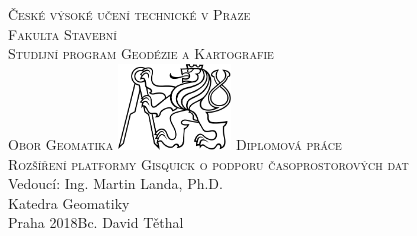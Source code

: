 \begin{center}
\newcommand{\napisCVUT}{České výsoké učení technické v Praze}
\newcommand{\napisFS}{Fakulta Stavební}
\newcommand{\napisProgram}{Studijní program Geodézie a Kartografie}
\newcommand{\napisObor}{Obor Geomatika}
\newcommand{\napisKatedra}{Katedra Geomatiky}
\newcommand{\napisVedouci}{Vedoucí: Ing. Martin Landa, Ph.D.}
\newcommand{\napisAutor}{Bc. David Těthal}
\newcommand{\napisDatum}{Praha 2018}
\newcommand{\napisNazevI}{Rozšíření platformy Gisquick o podporu časoprostorových dat}
\newcommand{\napisDiplomka}{Diplomová práce}
%
\newcommand{\velka}[1]{\textsc{#1}}
%
% 
\newif\ifpatitul
\patitultrue


{\Large\velka{\napisCVUT}}\\
{\Large\velka{\napisFS}}\\
{\Large\velka{\napisProgram}}\\
{\Large\velka{\napisObor}}
\vfill
\includegraphics[width=3cm]{../img/logo_cvut_cb} %
\vfill
{\Large\velka{\napisDiplomka}}\\
\Large\velka{\napisNazevI}\\
\vfill
{\large%
\napisVedouci\\
\napisKatedra\\
\bigskip
\napisDatum\hfill\napisAutor}
\end{center}
